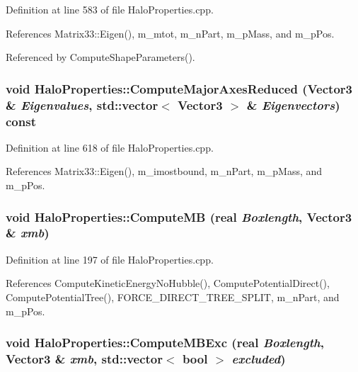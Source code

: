 Definition at line 583 of file HaloProperties.cpp.



References Matrix33::Eigen(), m\_\-mtot, m\_\-nPart, m\_\-pMass, and m\_\-pPos.



Referenced by ComputeShapeParameters().

\subsubsection[{ComputeMajorAxesReduced}]{\setlength{\rightskip}{0pt plus 5cm}void HaloProperties::ComputeMajorAxesReduced ({\bf Vector3} \& {\em Eigenvalues}, \/  std::vector$<$ {\bf Vector3} $>$ \& {\em Eigenvectors}) const}\label{classHaloProperties_a2fe7ded61657178551618214d0a978b8}


Definition at line 618 of file HaloProperties.cpp.



References Matrix33::Eigen(), m\_\-imostbound, m\_\-nPart, m\_\-pMass, and m\_\-pPos.

\subsubsection[{ComputeMB}]{\setlength{\rightskip}{0pt plus 5cm}void HaloProperties::ComputeMB ({\bf real} {\em Boxlength}, \/  {\bf Vector3} \& {\em xmb})}\label{classHaloProperties_aabd66cd248656d59603f8b595a22ce17}


Definition at line 197 of file HaloProperties.cpp.



References ComputeKineticEnergyNoHubble(), ComputePotentialDirect(), ComputePotentialTree(), FORCE\_\-DIRECT\_\-TREE\_\-SPLIT, m\_\-nPart, and m\_\-pPos.

\subsubsection[{ComputeMBExc}]{\setlength{\rightskip}{0pt plus 5cm}void HaloProperties::ComputeMBExc ({\bf real} {\em Boxlength}, \/  {\bf Vector3} \& {\em xmb}, \/  std::vector$<$ bool $>$ {\em excluded})}\label{classHaloProperties_aff8caa920de95062ee0b89e955cd49d7}


